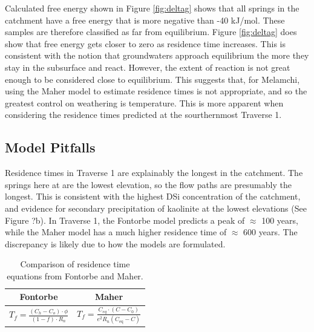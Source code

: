 \FloatBarrier

Calculated free energy shown in Figure \ref{fig:deltag} shows that all springs in the catchment have a free energy that is more negative than -40 kJ/mol. These samples are therefore classified as far from equilibrium. Figure \ref{fig:deltag} does show that free energy gets closer to zero as residence time increases. This is consistent with the notion that groundwaters approach equilibrium the more they stay in the subsurface and react. However, the extent of reaction is not great enough to be considered close to equilibrium. This suggests that, for Melamchi, using the Maher model to estimate residence times is not appropriate, and so the greatest control on weathering is temperature. This is more apparent when considering the residence times predicted at the sourthernmost Traverse 1.


\subsection{Model Pitfalls}

Residence times in Traverse 1 are explainably the longest in the catchment. The springs here at are the lowest elevation, so the flow paths are presumably the longest. This is consistent with the highest DSi concentration of the catchment, and evidence for secondary precipitation of kaolinite at the lowest elevations (See Figure ?b). In Traverse 1, the Fontorbe model predicts a peak of $\approx$ 100 years, while the Maher model has a much higher residence time of $\approx$ 600 years. The discrepancy is likely due to how the models are formulated.

\begin{table}[h]
    \centering
    \renewcommand{\arraystretch}{2.2} %
    \begin{tabular}{cc}
        \toprule
        \textbf{Fontorbe} & \textbf{Maher} \\
        \midrule
        $\displaystyle T_f  = \frac{\left(C_h - C_o\right)\cdot\phi}{\left(1-f\right)\cdot R_n}$ & 
        $\displaystyle T_f = \frac{C_{eq} \cdot \left(C - C_0\right)}{e^2 R_n \left( C_{\text{eq}} - C \right)}$ \\ [10pt]
        \bottomrule
    \end{tabular}
    \caption{Comparison of residence time equations from Fontorbe and Maher.}
    \label{tab:equations}
\end{table}

